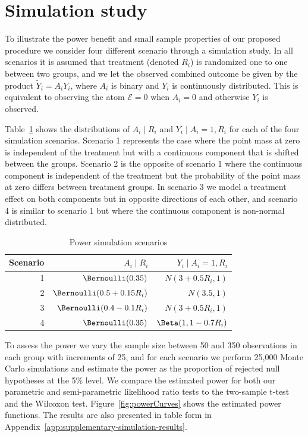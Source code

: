 \section{Simulation study}\label{sec:simulation-study}

To illustrate the power benefit and small sample properties of our proposed procedure we consider four different scenario through a simulation study. In all scenarios it is assumed that treatment (denoted $R_i$) is randomized one to one between two groups, and we let the observed combined outcome be given by the product $\widetilde{Y}_i = A_i Y_i$, where $A_i$ is binary and $Y_i$ is continuously distributed. This is equivalent to observing the atom $\mathcal{E} = 0$ when $A_i = 0$ and otherwise $Y_i$ is observed.

Table~\ref{tab:simulation} shows the distributions of $A_i \mid R_i$ and $Y_i \mid A_i = 1, R_i$ for each of the four simulation scenarios. Scenario 1 represents the case where the point mass at zero is independent of the treatment but with a continuous component that is shifted between the groups. Scenario 2 is the opposite of scenario 1 where the continuous component is independent of the treatment but the probability of the point mass at zero differs between treatment groups. In scenario 3 we model a treatment effect on both components but in opposite directions of each other, and scenario 4 is similar to scenario 1 but where the continuous component is non-normal distributed.

\begin{table}[htbp]
\centering
\begin{tabular}{r|r|r}
Scenario & $A_i \mid R_i$ & $Y_i \mid A_i = 1, R_i$\\ \hline
1 & $\Bernoulli(0.35)$ & $N(3 + 0.5R_i, 1)$\\
2 & $\Bernoulli(0.5 + 0.15R_i)$ & $N(3.5, 1)$\\
3 & $\Bernoulli(0.4 - 0.1R_i)$ & $N(3 + 0.5 R_i, 1)$\\
4 & $\Bernoulli(0.35)$ & $\Beta(1, 1-0.7R_i)$
\end{tabular}
\caption{Power simulation scenarios}
\label{tab:simulation}
\end{table}

To assess the power we vary the sample size between 50 and 350 observations in each group with increments of 25, and for each scenario we perform 25,000 Monte Carlo simulations and estimate the power as the proportion of rejected null hypotheses at the 5\% level. We compare the estimated power for both our parametric and semi-parametric likelihood ratio tests to the two-sample t-test and the Wilcoxon test. Figure~\ref{fig:powerCurves} shows the estimated power functions. The results are also presented in table form in Appendix~\ref{app:supplementary-simulation-results}.

